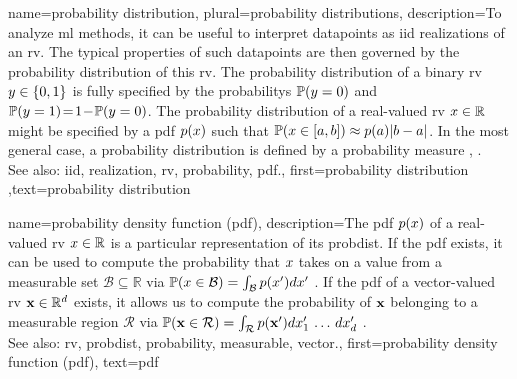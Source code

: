 {name={probability distribution}, plural={probability distributions},
	description={To analyze \gls{ml} methods, it can be useful 
		to interpret \glspl{datapoint} as \gls{iid} \glspl{realization} of an \gls{rv}. The typical 
		properties of such \glspl{datapoint} are then governed by the \gls{probability} distribution 
		of this \gls{rv}. The \gls{probability} distribution of a binary \gls{rv} $y \in \{0,1\}$ 
		is fully specified by the \glspl{probability} $\mathbb{P}({y = 0})$ and 
		$\mathbb{P}({y=1})\!=\!1\!-\!\mathbb{P}({y=0})$. The \gls{probability} 
		distribution of a real-valued \gls{rv} $x \in \mathbb{R}$ might be specified 
		by a \gls{pdf} $p(x)$ such that $\mathbb{P}({ x \in [a,b] }) \approx  p(a) |b-a|$. 
	    	In the most general case, a \gls{probability} distribution is defined by a \gls{probability} measure 
		\cite{BillingsleyProbMeasure}, \cite{GrayProbBook}.
	    		\\
		See also: \gls{iid}, \gls{realization}, \gls{rv}, \gls{probability}, \gls{pdf}.},
	first={probability distribution}
	,text={probability distribution}
}
    
    
{name={probability density function (pdf)},
	description={The pdf $p(x)$ of a real-valued \gls{rv} 
		$x \in \mathbb{R}$ is a particular representation of its \gls{probdist}. If the pdf exists, it can 
		be used to compute the \gls{probability} that $x$ takes on a value from a \gls{measurable} set 
		$\mathcal{B} \subseteq \mathbb{R}$ via $\mathbb{P}({x \in \mathcal{B}}) = \int_{\mathcal{B}} p(x') d x'$ \cite[Ch. 3]{BertsekasProb}. 
		If the pdf of a \gls{vector}-valued \gls{rv} ${\bf x} \in \mathbb{R}^{d}$ exists, it 
        		allows us to compute the \gls{probability} of ${\bf x}$ belonging to a \gls{measurable} region $\mathcal{R}$ via 
        		$\mathbb{P}({{\bf x} \in \mathcal{R}}) = \int_{\mathcal{R}} p({\bf x}') d x_{1}' \,\ldots \,d x_{d}' $ \cite[Ch. 3]{BertsekasProb}.
        		\\
		See also: \gls{rv}, \gls{probdist}, \gls{probability}, \gls{measurable}, \gls{vector}.},
	first={probability density function (pdf)},
	text={pdf}
}


